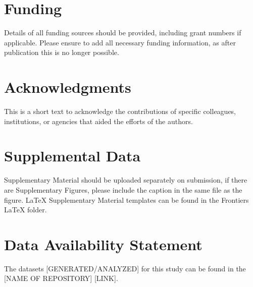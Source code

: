 \documentclass[utf8]{FrontiersinHarvard} %
\providecommand{\href}[2]{#2}
\renewcommand*{\|}[1][]{\nonscript\:#1\vert\nonscript\:\mathopen{}}
\begin{document}
\section*{Funding}
Details of all funding sources should be provided, including grant numbers if applicable. Please ensure to add all necessary funding information, as after publication this is no longer possible.

\section*{Acknowledgments}
This is a short text to acknowledge the contributions of specific colleagues, institutions, or agencies that aided the efforts of the authors.

\section*{Supplemental Data}
 \href{http://home.frontiersin.org/about/author-guidelines#SupplementaryMaterial}{Supplementary Material} should be uploaded separately on submission, if there are Supplementary Figures, please include the caption in the same file as the figure. LaTeX Supplementary Material templates can be found in the Frontiers LaTeX folder.

\section*{Data Availability Statement}
The datasets [GENERATED/ANALYZED] for this study can be found in the [NAME OF REPOSITORY] [LINK].



\end{document}
